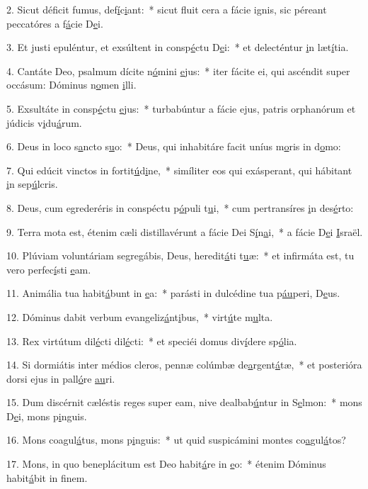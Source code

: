2. Sicut déficit fumus, def\uline{í}c\uline{i}ant:~* sicut fluit cera a fácie ignis, sic péreant peccatóres a f\uline{á}cie D\uline{e}i.\par 
3. Et justi epuléntur, et exsúltent in consp\uline{é}ctu D\uline{e}i:~* et delecténtur \uline{i}n læt\uline{í}tia.\par 
4. Cantáte Deo, psalmum dícite n\uline{ó}mini \uline{e}jus:~* iter fácite ei, qui ascéndit super occásum: Dóminus n\uline{o}men \uline{i}lli.\par 
5. Exsultáte in consp\uline{é}ctu \uline{e}jus:~* turbabúntur a fácie ejus, patris orphanórum et júdicis v\uline{i}du\uline{á}rum.\par 
6. Deus in loco s\uline{a}ncto s\uline{u}o:~* Deus, qui inhabitáre facit uníus m\uline{o}ris in d\uline{o}mo:\par 
7. Qui edúcit vinctos in fortit\uline{ú}d\uline{i}ne,~* simíliter eos qui exásperant, qui hábitant \uline{i}n sep\uline{ú}lcris.\par 
8. Deus, cum egrederéris in conspéctu p\uline{ó}puli t\uline{u}i,~* cum pertransíres \uline{i}n des\uline{é}rto:\par 
9. Terra mota est, étenim cæli distillavérunt a fácie Dei S\uline{í}n\uline{a}i,~* a fácie D\uline{e}i \uline{I}sraël.\par 
10. Plúviam voluntáriam segregábis, Deus, heredit\uline{á}ti t\uline{u}æ:~* et infirmáta est, tu vero perfec\uline{í}sti \uline{e}am.\par 
11. Animália tua habit\uline{á}bunt in \uline{e}a:~* parásti in dulcédine tua p\uline{áu}peri, D\uline{e}us.\par 
12. Dóminus dabit verbum evangeliz\uline{á}nt\uline{i}bus,~* virt\uline{ú}te m\uline{u}lta.\par 
13. Rex virtútum dil\uline{é}cti dil\uline{é}cti:~* et speciéi domus div\uline{í}dere sp\uline{ó}lia.\par 
14. Si dormiátis inter médios cleros, pennæ colúmbæ de\uline{a}rgent\uline{á}tæ,~* et posterióra dorsi ejus in pall\uline{ó}re \uline{au}ri.\par 
15. Dum discérnit cæléstis reges super eam, nive dealbab\uline{ú}ntur in S\uline{e}lmon:~* mons D\uline{e}i, mons p\uline{i}nguis.\par 
16. Mons coagul\uline{á}tus, mons p\uline{i}nguis:~* ut quid suspicámini montes co\uline{a}gul\uline{á}tos?\par 
17. Mons, in quo beneplácitum est Deo habit\uline{á}re in \uline{e}o:~* étenim Dóminus habit\uline{á}bit in f\uline{i}nem.\par 
